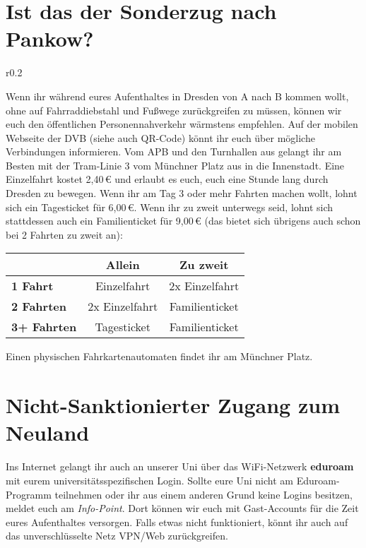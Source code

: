 \section*{Ist das der Sonderzug nach Pankow?}

\begin{wrapfigure}[6]{r}{0.2\textwidth}
  \vspace*{-11pt}
  \textcolor{KIFgrey}{}
\end{wrapfigure}

Wenn ihr während eures Aufenthaltes in Dresden von A nach B kommen wollt, ohne auf Fahrraddiebstahl und Fußwege zurückgreifen zu müssen, können wir euch den öffentlichen Personennahverkehr wärmstens empfehlen.
Auf der mobilen Webseite der DVB  (siehe auch QR-Code) könnt ihr euch über mögliche Verbindungen informieren.
Vom APB und den Turnhallen aus gelangt ihr am Besten mit der Tram-Linie 3 vom Münchner Platz aus in die Innenstadt.
Eine Einzelfahrt kostet 2,40\,€ und erlaubt es euch, euch eine Stunde lang durch Dresden zu bewegen. Wenn ihr am Tag 3 oder mehr Fahrten machen wollt, lohnt sich ein Tagesticket für 6,00\,€. Wenn ihr zu zweit unterwegs seid, lohnt sich stattdessen auch ein Familienticket für 9,00\,€ (das bietet sich übrigens auch schon bei 2 Fahrten zu zweit an):

\begin{center}
\begin{tabular}{l | c | c}
& \textbf{Allein} & \textbf{Zu zweit} \\ \hline
\textbf{1 Fahrt} & Einzelfahrt & 2x Einzelfahrt \\ \hline
\textbf{2 Fahrten} & 2x Einzelfahrt & Familienticket \\ \hline
\textbf{3+ Fahrten} & Tagesticket & Familienticket \\
\end{tabular}
\end{center}

Einen physischen Fahrkartenautomaten findet ihr am Münchner Platz.

\section*{Nicht-Sanktionierter Zugang zum Neuland}

Ins Internet gelangt ihr auch an unserer Uni über das WiFi-Netzwerk \textbf{eduroam} mit eurem universitätsspezifischen Login.
Sollte eure Uni nicht am Eduroam-Programm teilnehmen oder ihr aus einem anderen Grund keine Logins besitzen, meldet euch am \emph{Info-Point}.
Dort können wir euch mit Gast-Accounts für die Zeit eures Aufenthaltes versorgen.
Falls etwas nicht funktioniert, könnt ihr auch auf das unverschlüsselte Netz VPN/Web zurückgreifen.


